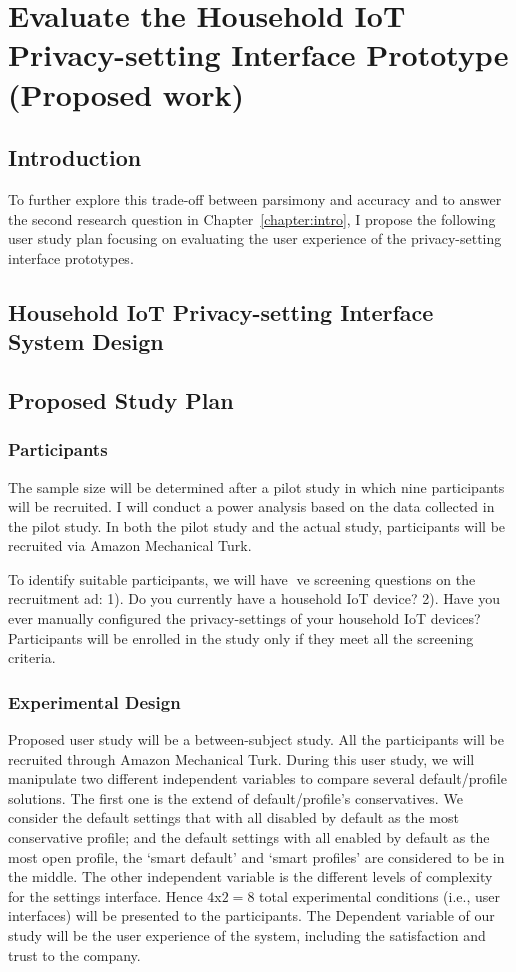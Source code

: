 \chapter{Evaluate the Household IoT Privacy-setting Interface Prototype (Proposed work)}\label{chapter:evaluation}

\section{Introduction}
To further explore this trade-off between parsimony and accuracy and to answer the second research question in Chapter~\ref{chapter:intro}, I propose the following user study plan focusing on evaluating the user experience of the privacy-setting interface prototypes.
\section{Household IoT Privacy-setting Interface System Design}


\section{Proposed Study Plan}

\subsection{Participants}
The sample size will be determined after a pilot study in which nine participants will be
recruited. I will conduct a power analysis based on the data collected in the pilot study. In both
the pilot study and the actual study, participants will be recruited via Amazon Mechanical Turk.

To identify suitable participants, we will have ve screening questions on the
recruitment ad:
1). Do you currently have a household IoT device?
2). Have you ever manually configured the privacy-settings of your household IoT devices?
Participants will be enrolled in the study only if they meet all the screening criteria.

\subsection{Experimental Design}

Proposed user study will be a between-subject study. All the participants will be recruited through Amazon Mechanical Turk. During this user study, we will manipulate two different independent variables to compare several default/profile solutions. The first one is the extend of default/profile's conservatives. We consider the default settings that with all disabled by default as the most conservative profile; and the default settings with all enabled by default as the most open profile, the `smart default' and `smart profiles' are considered to be in the middle. The other independent variable is the different levels of complexity for the settings interface. Hence $4$x$2=8$ total experimental conditions (i.e., user interfaces) will be presented to the participants. The Dependent variable of our study will be the user experience of the system, including the satisfaction and trust to the company.

